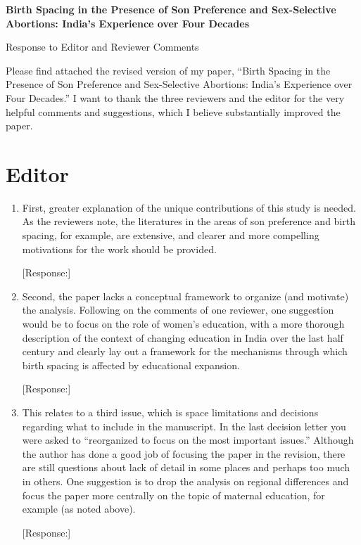 \documentclass[letterpaper,12pt]{article}
\title{} \author{}
\begin{document}
\begin{center} \textbf{\large Birth Spacing in the Presence of Son
Preference and 
Sex-Selective Abortions: India's Experience over Four Decades}
\end{center}

\begin{center} Response to Editor and Reviewer Comments \end{center}

\noindent Please find attached the revised version of my paper,
``Birth Spacing in the Presence of Son Preference and Sex-Selective
Abortions:
India's Experience over Four Decades.''
I want to thank the three reviewers and the editor for the very helpful comments and 
suggestions, which I believe substantially improved the paper.

\section*{Editor}

\begin{enumerate}

\item First, greater explanation of the unique contributions of this
study is needed. As the reviewers note, the literatures in the areas of
son preference and birth spacing, for example, are extensive, and
clearer and more compelling motivations for the work should be provided.

[Response:]

\item Second, the paper lacks a conceptual framework to organize (and
motivate) the analysis. Following on the comments of one reviewer, one
suggestion would be to focus on the role of women’s education, with a
more thorough description of the context of changing education in India
over the last half century and clearly lay out a framework for the
mechanisms through which birth spacing is affected by educational
expansion.

[Response:]

\item This relates to a third issue, which is space limitations and
decisions regarding what to include in the manuscript. In the last
decision letter you were asked to “reorganized to focus on the most
important issues.” Although the author has done a good job of focusing
the paper in the revision, there are still questions about lack of
detail in some places and perhaps too much in others. One suggestion is
to drop the analysis on regional differences and focus the paper more
centrally on the topic of maternal education, for example (as noted
above).

[Response:]


\end{enumerate}
\end{document}
